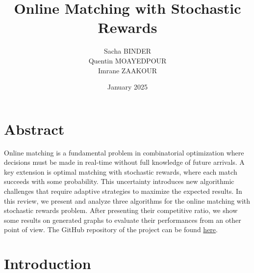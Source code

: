 \documentclass[12pt, twocolumn]{article}
\title{\fontsize{20pt}{10pt} \selectfont  Online Matching with Stochastic Rewards}
\author{
    \small Sacha BINDER
    \email{sacha.binder@eleves.enpc.fr} \\
    \small Quentin MOAYEDPOUR \email{qmoayedpour@ensae.fr}\\
    \small Imrane ZAAKOUR 
    \email{imrane.zaakour@ensae.fr}
    }
\date{\small January 2025}
\begin{document}
\maketitle

\section*{Abstract}

\par
\hspace{\parindent}Online matching is a fundamental problem in combinatorial optimization where decisions must be made in real-time without full knowledge of future arrivals. A key extension is optimal matching with stochastic rewards, where each match succeeds with some probability. This uncertainty introduces new algorithmic challenges that require adaptive strategies to maximize the expected results. In this review, we present and analyze three algorithms for the online matching with stochastic rewards problem. After presenting their competitive ratio, we show some results on generated graphs to evaluate their performances from an other point of view. The GitHub repository of the project can be found \href{https://github.com/QMoayedpour/OnlineMatchingStochastic}{here}. 

\section{Introduction}
\end{document}
